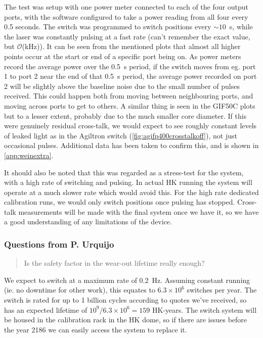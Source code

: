 \documentclass[a4paper,11pt]{article}
\let\oldsim\sim
\renewcommand{\sim}{{\oldsim}}
\begin{document}
The test was setup with one power meter connected to each of the four output ports, with the software configured to take a power reading from all four every 0.5 seconds. The switch was programmed to switch positions every $\sim10$~s, while the laser was constantly pulsing at a fast rate (can't remember the exact value, but $\mathcal{O}$(kHz)). It can be seen from the mentioned plots that almost all higher points occur at the start or end of a specific port being on. As power meters record the average power over the 0.5~s period, if the switch moves from eg. port 1 to port 2 near the end of that 0.5~s period, the average power recorded on port 2 will be slightly above the baseline noise due to the small number of pulses received. This could happen both from moving between neighbouring ports, and moving across ports to get to others. A similar thing is seen in the GIF50C plots but to a lesser extent, probably due to the much smaller core diameter. If this were genuinely residual cross-talk, we would expect to see roughly constant levels of leaked light as in the Agiltron switch (\cref{fig:agifp400crosstalkoff}), not just occasional pulses. Additional data has been taken to confirm this, and is shown in \cref{app:weinextra}.

It should also be noted that this was regarded as a stress-test for the system, with a high rate of switching and pulsing. In actual HK running the system will operate at a much slower rate which would avoid this. For the high rate dedicated calibration runs, we would only switch positions once pulsing has stopped. Cross-talk measurements will be made with the final system once we have it, so we have a good understanding of any limitations of the device.

\subsubsection{Questions from P. Urquijo}
\begin{quote}
    Is the safety factor in the wear-out lifetime really enough?
\end{quote}
We expect to switch at a maximum rate of 0.2~Hz. Assuming constant running (ie. no downtime for other work), this equates to $6.3\times10^6$ switches per year. The switch is rated for up to 1 billion cycles according to quotes we've received, so has an expected lifetime of $10^9/6.3\times10^6 = 159$ HK-years. The switch system will be housed in the calibration rack in the HK dome, so if there are issues before the year 2186 we can easily access the system to replace it.
\end{document}
